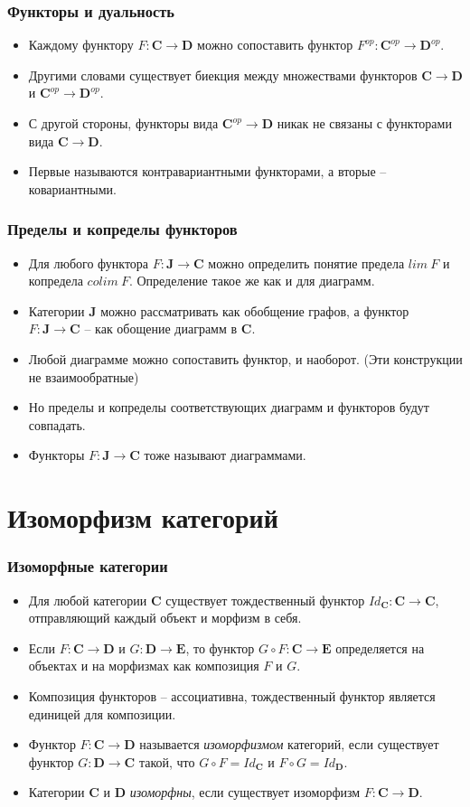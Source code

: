 \documentclass{beamer}
\theoremstyle{definition}
\newcommand{\cat}[1]{\mathbf{#1}}
\renewcommand{\C}{\cat{C}}
\newcommand{\D}{\cat{D}}
\newcommand{\E}{\cat{E}}
\begin{document}
\begin{frame}
\frametitle{Функторы и дуальность}
\begin{itemize}
\item Каждому функтору $F : \C \to \D$ можно сопоставить функтор $F^{op} : \C^{op} \to \D^{op}$.
\item Другими словами существует биекция между множествами функторов $\C \to \D$ и $\C^{op} \to \D^{op}$.
\item С другой стороны, функторы вида $\C^{op} \to \D$ никак не связаны с функторами вида $\C \to \D$.
\item Первые называются контравариантными функторами, а вторые -- ковариантными.
\end{itemize}
\end{frame}

\begin{frame}
\frametitle{Пределы и копределы функторов}
\begin{itemize}
\item Для любого функтора $F : \cat{J} \to \C$ можно определить понятие предела $lim\ F$ и копредела $colim\ F$. Определение такое же как и для диаграмм.
\item Категории $\cat{J}$ можно рассматривать как обобщение графов, а функтор $F : \cat{J} \to \C$ -- как обощение диаграмм в $\C$.
\item Любой диаграмме можно сопоставить функтор, и наоборот. (Эти конструкции не взаимообратные)
\item Но пределы и копределы соответствующих диаграмм и функторов будут совпадать.
\item Функторы $F : \cat{J} \to \C$ тоже называют диаграммами.
\end{itemize}
\end{frame}

\section{Изоморфизм категорий}

\begin{frame}
\frametitle{Изоморфные категории}
\begin{itemize}
\item Для любой категории $\C$ существует тождественный функтор $Id_\C : \C \to \C$, отправляющий каждый объект и морфизм в себя.
\item Если $F : \C \to \D$ и $G : \D \to \E$, то функтор $G \circ F : \C \to \E$ определяется на объектах и на морфизмах как композиция $F$ и $G$.
\item Композиция функторов -- ассоциативна, тождественный функтор является единицей для композиции.
\item Функтор $F : \C \to \D$ называется \emph{изоморфизмом} категорий, если существует функтор $G : \D \to \C$ такой, что $G \circ F = Id_\C$ и $F \circ G = Id_\D$.
\item Категории $\C$ и $\D$ \emph{изоморфны}, если существует изоморфизм $F : \C \to \D$.
\end{itemize}
\end{frame}
\end{document}
